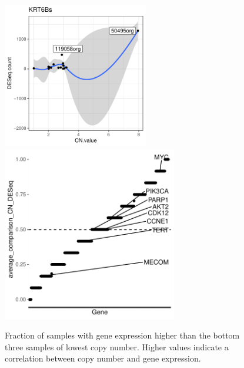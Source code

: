 \documentclass{article}
\begin{document}
\begin{figure}[h]
\includegraphics[width=2.5in]{../../RNASeq_and_CN/figures/example_KRT6B.pdf}
\includegraphics[width=3in]{../../RNASeq_and_CN/figures/average_bottomCN_DESeq.pdf}
\caption{Fraction of samples with gene expression higher than the bottom three samples of lowest copy number. Higher values indicate a correlation between copy number and gene expression.}
\end{figure}
\end{document}
